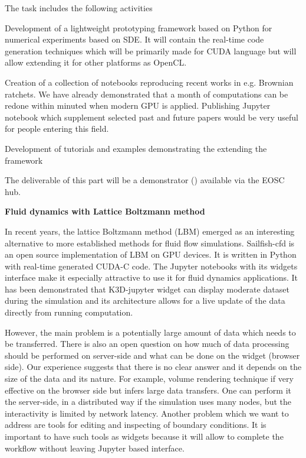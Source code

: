 \begin{task}[
  title=Application: Reproducible research based on GPU,
  id=application-gpu,
  lead=SIL,
  PM=12,
  wphases={4-36},
  partners={EGI}
]
The task includes the following activities

  \begin{compactitem}
  \item Development of a lightweight prototyping framework based on Python for numerical experiments based on SDE. It will contain the real-time code generation techniques which will be primarily made for CUDA language but will allow extending it for other platforms as OpenCL.
  \item Creation of a collection of notebooks reproducing recent works in e.g. Brownian ratchets. We have already demonstrated \cite{januszewski2010accelerating,spiechowicz2015gpu} that a month of computations can be redone within minuted when modern GPU is applied. Publishing Jupyter notebook which supplement selected past and future papers would be very useful for people entering this field.
  \item Development of tutorials and examples demonstrating the extending the framework

  \end{compactitem}

The deliverable of this part will be a demonstrator () available via the EOSC hub.


\textbf{Fluid dynamics with Lattice Boltzmann method}

In recent years, the lattice Boltzmann method (LBM) emerged as an interesting alternative to more established methods for fluid flow simulations. Sailfish-cfd \cite{januszewski2014sailfish} is an open source implementation of LBM on GPU devices. It is written in Python with real-time generated CUDA-C code. The Jupyter notebooks with its widgets interface make it especially attractive to use it for fluid dynamics applications. It has been demonstrated that K3D-jupyter widget can display moderate dataset during the simulation and its architecture allows for a live update of the data directly from running computation.

However, the main problem is a potentially large amount of data which needs to be transferred. There is also an open question on how much of data processing should be performed on server-side and what can be done on the widget (browser side). Our experience suggests that there is no clear answer and it depends on the size of the data and its nature. For example, volume rendering technique if very effective on the browser side but infers large data transfers. One can perform it the server-side, in a distributed way if the simulation uses many nodes, but the interactivity is limited by network latency.
Another problem which we want to address are tools for editing and inspecting of boundary conditions. It is important to have such tools as widgets because it will allow to complete the workflow without leaving Jupyter based interface.




\end{task}
